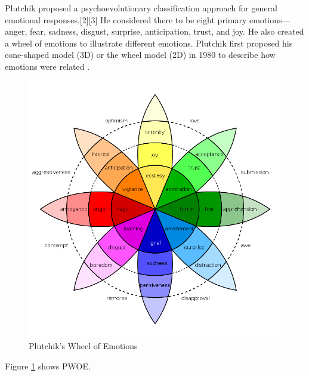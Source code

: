 Plutchik proposed a psychoevolutionary classification approach for general emotional responses.[2][3] He considered there to be eight primary emotions—anger, fear, sadness, disgust, surprise, anticipation, trust, and joy.
He also created a wheel of emotions to illustrate different emotions. Plutchik first proposed his cone-shaped model (3D) or the wheel model (2D) in 1980 to describe how emotions were related \cite{enwiki:1136521972}.
\begin{figure}[H]
	\includegraphics[width=\columnwidth, keepaspectratio]{Plutchik'sWheelofEmotions}
	\caption{Plutchik's Wheel of Emotions}
	\label{Fig:fig1}
\end{figure}
Figure \ref{Fig:fig1} shows PWOE.
